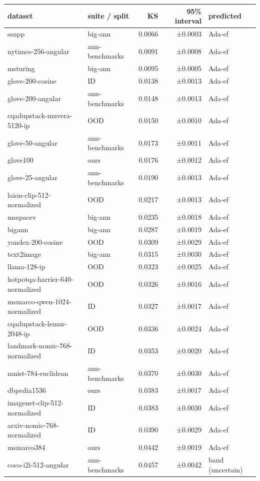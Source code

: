 \begin{tabular}{llrrl}
\toprule
dataset & suite / split & KS & 95\% interval & predicted \\
\midrule
ssnpp & big-ann & 0.0066 & ±0.0003 & Ada-ef \\
nytimes-256-angular & ann-benchmarks & 0.0091 & ±0.0008 & Ada-ef \\
msturing & big-ann & 0.0095 & ±0.0005 & Ada-ef \\
glove-200-cosine & ID & 0.0138 & ±0.0013 & Ada-ef \\
glove-200-angular & ann-benchmarks & 0.0148 & ±0.0013 & Ada-ef \\
cqadupstack-muvera-5120-ip & OOD & 0.0150 & ±0.0010 & Ada-ef \\
glove-50-angular & ann-benchmarks & 0.0173 & ±0.0011 & Ada-ef \\
glove100 & ours & 0.0176 & ±0.0012 & Ada-ef \\
glove-25-angular & ann-benchmarks & 0.0190 & ±0.0013 & Ada-ef \\
laion-clip-512-normalized & OOD & 0.0217 & ±0.0013 & Ada-ef \\
msspacev & big-ann & 0.0235 & ±0.0018 & Ada-ef \\
bigann & big-ann & 0.0287 & ±0.0019 & Ada-ef \\
yandex-200-cosine & OOD & 0.0309 & ±0.0029 & Ada-ef \\
text2image & big-ann & 0.0315 & ±0.0030 & Ada-ef \\
llama-128-ip & OOD & 0.0323 & ±0.0025 & Ada-ef \\
hotpotqa-harrier-640-normalized & OOD & 0.0326 & ±0.0016 & Ada-ef \\
msmarco-qwen-1024-normalized & ID & 0.0327 & ±0.0017 & Ada-ef \\
cqadupstack-lemur-2048-ip & OOD & 0.0336 & ±0.0024 & Ada-ef \\
landmark-nomic-768-normalized & ID & 0.0353 & ±0.0020 & Ada-ef \\
mnist-784-euclidean & ann-benchmarks & 0.0370 & ±0.0030 & Ada-ef \\
dbpedia1536 & ours & 0.0383 & ±0.0017 & Ada-ef \\
imagenet-clip-512-normalized & ID & 0.0383 & ±0.0030 & Ada-ef \\
arxiv-nomic-768-normalized & ID & 0.0390 & ±0.0029 & Ada-ef \\
msmarco384 & ours & 0.0442 & ±0.0019 & Ada-ef \\
coco-i2i-512-angular & ann-benchmarks & 0.0457 & ±0.0042 & band (uncertain) \\

\end{tabular}
